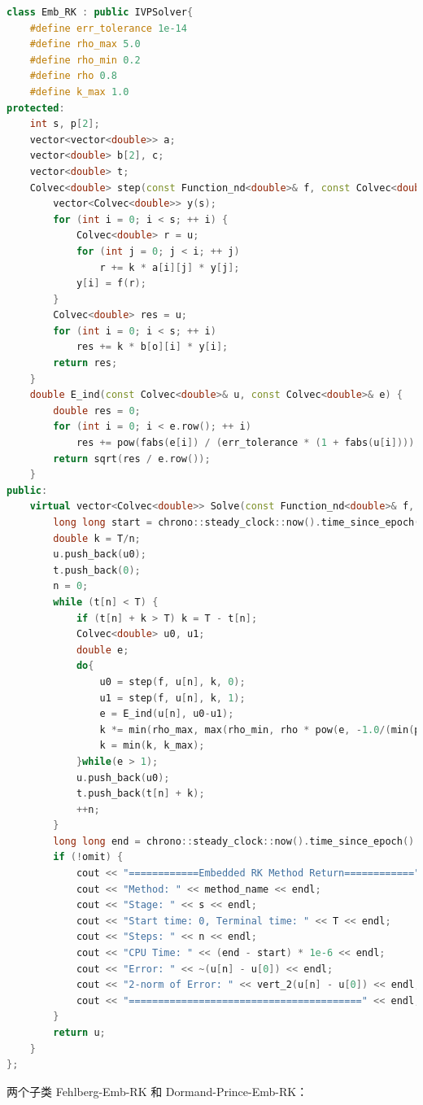 \documentclass{ctexart}
\begin{document}
\begin{lstlisting}[language=c++]
class Emb_RK : public IVPSolver{
	#define err_tolerance 1e-14
	#define rho_max 5.0
	#define rho_min 0.2
	#define rho 0.8
	#define k_max 1.0
protected:
	int s, p[2];
	vector<vector<double>> a;
	vector<double> b[2], c;
	vector<double> t;
	Colvec<double> step(const Function_nd<double>& f, const Colvec<double>& u, double k, bool o) {
		vector<Colvec<double>> y(s);
		for (int i = 0; i < s; ++ i) {
			Colvec<double> r = u;
			for (int j = 0; j < i; ++ j)
				r += k * a[i][j] * y[j];
			y[i] = f(r);
		}
		Colvec<double> res = u;
		for (int i = 0; i < s; ++ i) 
			res += k * b[o][i] * y[i];
		return res;
	}
	double E_ind(const Colvec<double>& u, const Colvec<double>& e) {
		double res = 0;
		for (int i = 0; i < e.row(); ++ i)
			res += pow(fabs(e[i]) / (err_tolerance * (1 + fabs(u[i]))), 2);
		return sqrt(res / e.row());
	}
public:
	virtual vector<Colvec<double>> Solve(const Function_nd<double>& f, const Colvec<double>& u0, double T, int n = 10000, int s = 0, bool omit = 0) {
		long long start = chrono::steady_clock::now().time_since_epoch().count();
		double k = T/n;
		u.push_back(u0);
		t.push_back(0);
		n = 0;
		while (t[n] < T) {
			if (t[n] + k > T) k = T - t[n];
			Colvec<double> u0, u1;
			double e;
			do{
				u0 = step(f, u[n], k, 0);
				u1 = step(f, u[n], k, 1);
				e = E_ind(u[n], u0-u1);
				k *= min(rho_max, max(rho_min, rho * pow(e, -1.0/(min(p[0], p[1])+1))));
				k = min(k, k_max);
			}while(e > 1);
			u.push_back(u0);
			t.push_back(t[n] + k);
			++n;
		}
		long long end = chrono::steady_clock::now().time_since_epoch().count();
		if (!omit) {
			cout << "============Embedded RK Method Return============" << endl;
			cout << "Method: " << method_name << endl;
			cout << "Stage: " << s << endl;
			cout << "Start time: 0, Terminal time: " << T << endl;
			cout << "Steps: " << n << endl;
			cout << "CPU Time: " << (end - start) * 1e-6 << endl;
			cout << "Error: " << ~(u[n] - u[0]) << endl;
			cout << "2-norm of Error: " << vert_2(u[n] - u[0]) << endl;
			cout << "========================================" << endl;
		}
		return u;
	}
};
\end{lstlisting}

两个子类 Fehlberg-Emb-RK 和 Dormand-Prince-Emb-RK：
\end{document}
